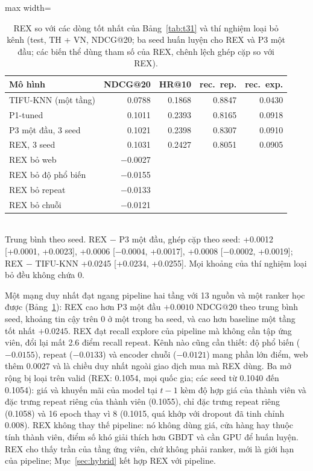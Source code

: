 \documentclass[jtehm]{ieeeaccess}
\begin{document}
\begin{table}[t]
\caption{REX so với các dòng tốt nhất của Bảng~\ref{tab:t31} và thí nghiệm loại bỏ kênh (test, TH + VN, NDCG@20; ba seed huấn
luyện cho REX và P3 một đầu; các biến thể dùng tham số của REX, chênh lệch ghép cặp so với REX).}
\label{tab:rex}
\setlength{\tabcolsep}{3pt}
\centering
\begin{adjustbox}{max width=\columnwidth}
\begin{tabular}{lrrrr}
\toprule
Mô hình & NDCG@20 & HR@10 & rec.\ rep. & rec.\ exp. \\
\midrule
TIFU-KNN (một tầng)       & 0.0788 & 0.1868 & 0.8847 & 0.0430 \\
P1-tuned                  & 0.1011 & 0.2393 & 0.8165 & 0.0918 \\
P3 một đầu, 3 seed        & 0.1021 & 0.2398 & 0.8307 & 0.0910 \\
REX, 3 seed               & 0.1031 & 0.2427 & 0.8051 & 0.0905 \\
\midrule
REX bỏ web                & $-$0.0027 & & & \\
REX bỏ độ phổ biến        & $-$0.0155 & & & \\
REX bỏ repeat             & $-$0.0133 & & & \\
REX bỏ chuỗi              & $-$0.0121 & & & \\
\bottomrule
\end{tabular}
\end{adjustbox}
\\[1ex]
{\footnotesize Trung bình theo seed. REX $-$ P3 một đầu, ghép cặp theo seed: +0.0012 [+0.0001, +0.0023], +0.0006 [$-$0.0004, +0.0017],
+0.0008 [$-$0.0002, +0.0019]; REX $-$ TIFU-KNN +0.0245 [+0.0234, +0.0255]. Mọi khoảng của thí nghiệm loại bỏ đều không chứa 0.}
\end{table}

Một mạng duy nhất đạt ngang pipeline hai tầng với 13 nguồn và một ranker học được (Bảng~\ref{tab:rex}): REX cao hơn P3 một đầu
$+0.0010$ NDCG@20 theo trung bình seed, khoảng tin cậy trên 0 ở một trong ba seed, và cao hơn baseline một tầng tốt nhất $+0.0245$.
REX đạt recall explore của pipeline mà không cần tập ứng viên, đổi lại mất 2.6 điểm recall repeat. Kênh nào cũng cần thiết: độ phổ
biến ($-0.0155$), repeat ($-0.0133$) và encoder chuỗi ($-0.0121$) mang phần lớn điểm, web thêm $0.0027$ và là chiều duy nhất ngoài
giao dịch mua mà REX dùng. Ba mở rộng bị loại trên valid (REX: 0.1054, mọi quốc gia; các seed từ 0.1040 đến 0.1054): giá và khuyến
mãi của model tại $t - 1$ kèm độ hợp giá của thành viên và đặc trưng repeat riêng của thành viên (0.1055), chỉ đặc trưng repeat riêng
(0.1058) và 16 epoch thay vì 8 (0.1015, quá khớp với dropout đã tinh chỉnh 0.008). REX không thay thế pipeline: nó không dùng giá,
cửa hàng hay thuộc tính thành viên, điểm số khó giải thích hơn GBDT và cần GPU để huấn luyện. REX cho thấy trần của tầng ứng viên,
chứ không phải ranker, mới là giới hạn của pipeline; Mục~\ref{sec:hybrid} kết hợp REX với pipeline.
\end{document}
